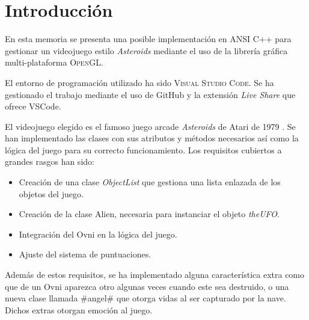 \section{Introducción}

En esta memoria se presenta una posible implementación en ANSI C++ para gestionar un videojuego estilo \emph{Asteroids} mediante el uso de la librería gráfica multi-plataforma \textsc{OpenGL}.

El entorno de programación utilizado ha sido \textsc{Visual Studio Code}. Se ha gestionado el trabajo mediante el uso de GitHub y la extensión \emph{Live Share} que ofrece VSCode.

El videojuego elegido es el famoso juego arcade \emph{Asteroids} de Atari de 1979 \cite{wiki}. Se han implementado las clases con sus atributos y métodos necesarios así como la lógica del juego para su correcto funcionamiento.
Los requisitos cubiertos a grandes rasgos han sido:
\begin{itemize}
    \item Creación de una clase \emph{ObjectList} que gestiona una lista enlazada de los objetos del juego.
    \item Creación de la clase Alien, necesaria para instanciar el objeto \emph{theUFO}.
    \item Integración del Ovni en la lógica del juego.
    \item Ajuste del sistema de puntuaciones.
\end{itemize}

Además de estos requisitos, se ha implementado alguna característica extra como que de un Ovni aparezca otro algunas veces cuando este sea destruido, o una nueva clase llamada \#angel\# que otorga vidas al ser capturado por la nave. Dichos extras otorgan emoción al juego.
